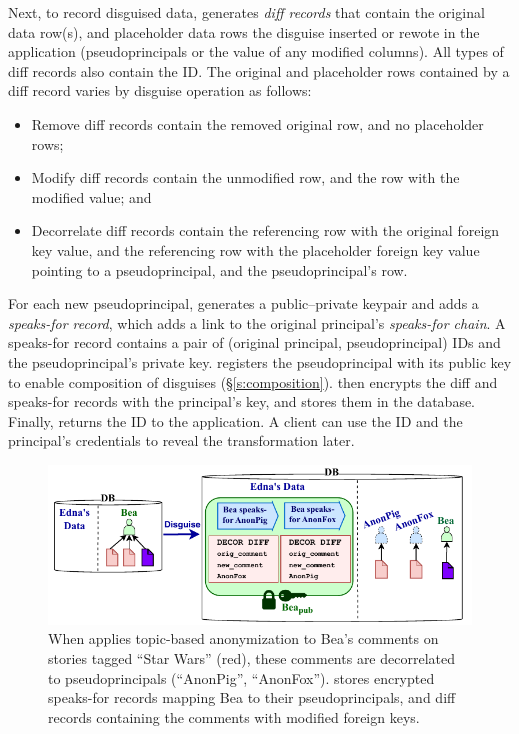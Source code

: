 %
Next, to record disguised data, \sys generates \emph{diff records} that contain \one{}
the original data row(s), and \two{} placeholder data rows the disguise inserted
or rewote in the application (\eg pseudoprincipals or the value of any modified
columns).
%
All types of diff records also contain the \xx ID. 
%
The original and placeholder rows contained by a diff record varies by disguise
operation as follows:
\begin{itemize}[nosep]
    \item Remove diff records contain \one{} the removed original row, and \two{} no
        placeholder rows;
    \item Modify diff records contain \one{} the unmodified row, and \two{} the
        row with the modified value; and
    \item Decorrelate diff records contain \one{} the referencing row with the original
        foreign key value, and \two{} the referencing row with the placeholder
        foreign key value pointing to a pseudoprincipal, and the pseudoprincipal's row.
\end{itemize}
%
For each new pseudoprincipal, \sys generates a public--private keypair and adds
a \emph{speaks-for record}, which adds a link to the original principal's
\emph{speaks-for chain}.
A speaks-for record contains a pair of (original principal,
pseudoprincipal) IDs and the pseudoprincipal’s
private key. \sys registers the pseudoprincipal with its public key to enable
composition of disguises (\S\ref{s:composition}).
%
\sys then encrypts the diff and speaks-for records with the principal's key,
and stores them in the database.
%
%
%
Finally, \sys returns the \xx ID to the application.
%
A client can use the \xx ID and the principal's
credentials to reveal the transformation later.
%

\begin{figure}[!t]
\centering
\includegraphics{figs/lobsters_catanon_visual}
\caption{When \sys applies topic-based anonymization to Bea's comments on
    stories tagged ``Star Wars'' (red), these comments are decorrelated to
    pseudoprincipals (``AnonPig'', ``AnonFox''). \sys stores encrypted
    speaks-for records mapping Bea to their
    pseudoprincipals, and diff records containing the comments with
    modified foreign keys.}
\label{f:lobsters_visual}
\end{figure}


